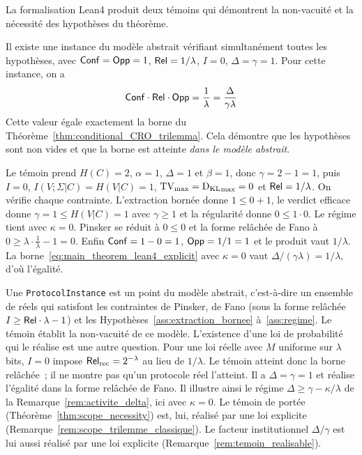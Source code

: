 \begin{sloppypar}
La formalisation Lean4 produit deux t\'emoins qui d\'emontrent la
non-vacuit\'e et la n\'ecessit\'e des hypoth\`eses du th\'eor\`eme.

\begin{theorem}
\label{thm:witness_consistency}
Il existe une instance du mod\`ele abstrait v\'erifiant simultan\'ement toutes
les hypoth\`eses, avec $\mathsf{Conf} = \mathsf{Opp} = 1$, $\mathsf{Rel} = 1/\lambda$, $I = 0$,
$\Delta = \gamma = 1$. Pour cette instance, on a
\begin{equation}
\mathsf{Conf} \cdot \mathsf{Rel} \cdot \mathsf{Opp} = \frac{1}{\lambda} = \frac{\Delta}{\gamma \lambda}
\end{equation}
Cette valeur \'egale exactement la borne du
Th\'eor\`eme~\ref{thm:conditional_CRO_trilemma}. Cela d\'emontre que les
hypoth\`eses sont non vides et que la borne est atteinte \emph{dans le
mod\`ele abstrait}.
\end{theorem}

\begin{Preuve}
Le t\'emoin prend $H(C) = 2$, $\alpha = 1$, $\Delta = 1$ et $\beta = 1$, donc
$\gamma = 2 - 1 = 1$, puis $I = 0$, $I(V;\Sigma|C) = H(V|C) = 1$, $\operatorname{TV}_{\max} = \operatorname{D_{\text{KL}}}_{\max} = 0$
et $\mathsf{Rel} = 1/\lambda$. On v\'erifie chaque contrainte. L'extraction born\'ee donne
$1 \leq 0 + 1$, le verdict efficace donne $\gamma = 1 \leq H(V|C) = 1$ avec
$\gamma \geq 1$ et la r\'egularit\'e donne $0 \leq 1 \cdot 0$. Le r\'egime tient avec
$\kappa = 0$. Pinsker se r\'eduit \`a $0 \leq 0$ et la forme rel\^ach\'ee de Fano \`a
$0 \geq \lambda \cdot \tfrac1\lambda - 1 = 0$. Enfin $\mathsf{Conf} = 1 - 0 = 1$, $\mathsf{Opp} = 1/1 = 1$
et le produit vaut $1/\lambda$. La borne~\eqref{eq:main_theorem_lean4_explicit} avec
$\kappa = 0$ vaut $\Delta/(\gamma\lambda) = 1/\lambda$, d'o\`u l'\'egalit\'e.
\end{Preuve}

\begin{remark}\label{rem:portee_temoin}
Une \texttt{ProtocolInstance} est un point du mod\`ele abstrait, c'est-\`a-dire un ensemble de r\'eels
qui satisfont les contraintes de Pinsker, de Fano (sous la forme rel\^ach\'ee
$I \geq \mathsf{Rel}\cdot\lambda - 1$) et les Hypoth\`eses~\ref{ass:extraction_bornee} \`a~\ref{ass:regime}. Le t\'emoin \'etablit la
non-vacuit\'e de ce mod\`ele. L'existence d'une loi de probabilit\'e qui le
r\'ealise est une autre question. Pour une loi r\'eelle avec $M$ uniforme sur $\lambda$ bits, $I = 0$
impose $\mathsf{Rel}_{\mathrm{rec}} = 2^{-\lambda}$ au lieu de $1/\lambda$. Le t\'emoin atteint donc la borne
rel\^ach\'ee~; il ne montre pas qu'un protocole r\'eel l'atteint. Il a $\Delta = \gamma = 1$
et r\'ealise l'\'egalit\'e dans la forme rel\^ach\'ee de Fano. Il illustre ainsi le r\'egime
$\Delta \geq \gamma - \kappa/\lambda$ de la Remarque~\ref{rem:activite_delta}, ici avec $\kappa = 0$. Le t\'emoin de port\'ee
(Th\'eor\`eme~\ref{thm:scope_necessity}) est, lui, r\'ealis\'e par une loi explicite
(Remarque~\ref{rem:scope_trilemme_classique}). Le facteur institutionnel
$\Delta/\gamma$ est lui aussi r\'ealis\'e par une loi explicite
(Remarque~\ref{rem:temoin_realisable}).
\end{remark}


\end{sloppypar}
